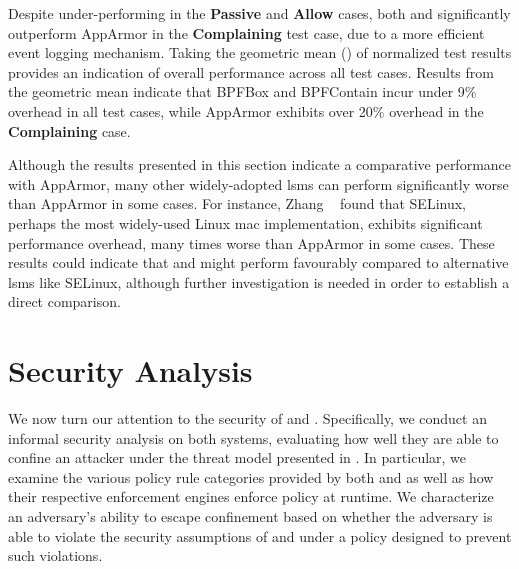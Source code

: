 
Despite under-performing in the \textbf{Passive} and \textbf{Allow} cases, both \bpfbox{}
and \bpfcontain{} significantly outperform AppArmor in the \textbf{Complaining} test case,
due to a more efficient event logging mechanism. Taking the geometric mean
() of normalized test results provides an indication of
overall performance across all test cases. Results from the geometric mean indicate that
BPFBox and BPFContain incur under 9\% overhead in all test cases, while AppArmor exhibits
over 20\% overhead in the \textbf{Complaining} case.

Although the results presented in this section indicate a comparative performance with
AppArmor, many other widely-adopted \glspl{lsm} can perform significantly worse than
AppArmor in some cases. For instance, Zhang \etal~\cite{zhang2021_lsm_file_overhead} found
that SELinux, perhaps the most widely-used Linux \gls{mac} implementation, exhibits
significant performance overhead, many times worse than AppArmor in some cases. These
results could indicate that \bpfbox{} and \bpfcontain{} might perform favourably compared
to alternative \glspl{lsm} like SELinux, although further investigation is needed in order
to establish a direct comparison.

\section{Security Analysis}%
\label{s:eval-security}

We now turn our attention to the security of \bpfbox{} and \bpfcontain. Specifically, we
conduct an informal security analysis on both systems, evaluating how well they are able
to confine an attacker under the threat model presented in . In
particular, we examine the various policy rule categories provided by both \bpfbox{} and
\bpfcontain{} as well as how their respective enforcement engines enforce policy at
runtime. We characterize an adversary's ability to escape confinement based on whether the
adversary is able to violate the security assumptions of \bpfbox{} and \bpfcontain{} under
a policy designed to prevent such violations.

